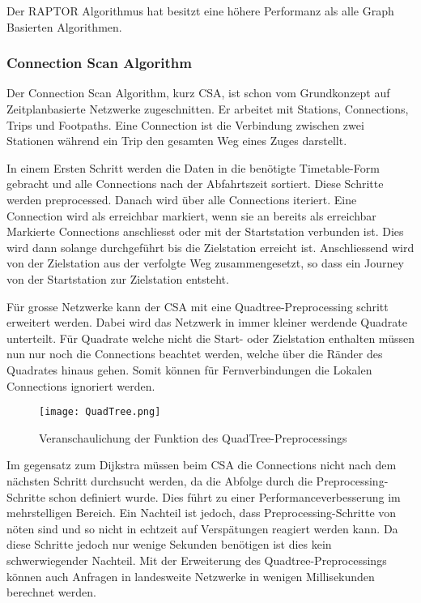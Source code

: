 Der RAPTOR Algorithmus hat besitzt eine höhere Performanz als alle Graph Basierten Algorithmen.

\subsubsection{Connection Scan Algorithm}
\label{sec:Connection Scan Algorithm}
Der Connection Scan Algorithm, kurz CSA, ist schon vom Grundkonzept auf Zeitplanbasierte Netzwerke zugeschnitten. Er arbeitet mit Stations, Connections, Trips und Footpaths. Eine Connection ist die Verbindung zwischen zwei Stationen während ein Trip den gesamten Weg eines Zuges darstellt. 

In einem Ersten Schritt werden die Daten in die benötigte Timetable-Form gebracht und alle Connections nach der Abfahrtszeit sortiert. Diese Schritte werden preprocessed. Danach wird über alle Connections iteriert. Eine Connection wird als erreichbar markiert, wenn sie an bereits als erreichbar Markierte Connections anschliesst oder mit der Startstation verbunden ist. Dies wird dann solange durchgeführt bis die Zielstation erreicht ist. Anschliessend wird von der Zielstation aus der verfolgte Weg zusammengesetzt, so dass ein Journey von der Startstation zur Zielstation entsteht. 

Für grosse Netzwerke kann der CSA mit eine Quadtree-Preprocessing schritt erweitert werden. Dabei wird das Netzwerk in immer kleiner werdende Quadrate unterteilt. Für Quadrate welche nicht die Start- oder Zielstation enthalten müssen nun nur noch die Connections beachtet werden, welche über die Ränder des Quadrates hinaus gehen. Somit können für Fernverbindungen die Lokalen Connections ignoriert werden.
\begin{figure}[]
	\centering
	\texttt{[image: QuadTree.png]}
	\caption{Veranschaulichung der Funktion des QuadTree-Preprocessings ~\cite{DBLP:journals/corr/DibbeltPSW17}}
	\label{fig:QuadTree}
\end{figure}


Im gegensatz zum Dijkstra müssen beim CSA die Connections nicht nach dem nächsten Schritt durchsucht werden, da die Abfolge durch die Preprocessing-Schritte schon definiert wurde. Dies führt zu einer Performanceverbesserung im mehrstelligen Bereich. Ein Nachteil ist jedoch, dass Preprocessing-Schritte von nöten sind und so nicht in echtzeit auf Verspätungen reagiert werden kann. Da diese Schritte jedoch nur wenige Sekunden benötigen ist dies kein schwerwiegender Nachteil. Mit der Erweiterung des Quadtree-Preprocessings können auch Anfragen in landesweite Netzwerke in wenigen Millisekunden berechnet werden. 

